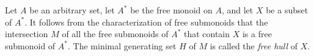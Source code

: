 \documentclass[12pt]{article}
\begin{document}
Let $A$ be an arbitrary set,
let $A^\ast$ be the free monoid on $A$,
and let $X$ be a subset of $A^\ast.$
It follows from the characterization of free submonoids
that the intersection $M$ of all the free submonoids of $A^\ast$
that contain $X$ is a free submonoid of $A^\ast$.
The minimal generating set $H$ of $M$
is called the \emph{free hull} of $X$.

\end{document}
